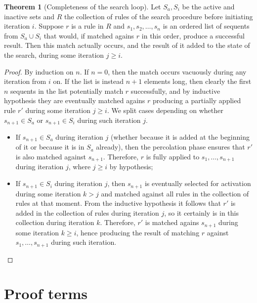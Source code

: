 \documentclass{article}
\theoremstyle{definition}
\newtheorem{theorem}{Theorem}
\begin{document}
\begin{theorem}[Completeness of the search loop]
  Let $S_a, S_i$ be the active and inactive sets and $R$ the collection of rules
  of the search procedure before initiating iteration $i$. Suppose $r$ is a rule
  in $R$ and $s_1, s_2, \dots, s_n$ is an ordered list of sequents from
  $S_a \cup S_i$ that would, if matched agains $r$ in this order, produce a
  successful result. Then this match actually occurs, and the result of it added
  to the state of the search, during some iteration $j \geq i$.
\end{theorem}
\begin{proof}
  By induction on $n$. If $n = 0$, then the match occurs vacuously during any
  iteration from $i$ on. If the list is instead $n+1$ elements long, then
  clearly the first $n$ sequents in the list potentially match $r$ successfully,
  and by inductive hypothesis they are eventually matched agains $r$ producing a
  partially applied rule $r'$ during some iteration $j \geq i$. We split cases
  depending on whether $s_{n+1} \in S_a$ or $s_{n+1} \in S_i$ during such
  iteration $j$.

  \begin{itemize}
  \item If $s_{n+1} \in S_a$ during iteration $j$ (whether because it is added
    at the beginning of it or because it is in $S_a$ already), then the
    percolation phase ensures that $r'$ is also matched against
    $s_{n+1}$. Therefore, $r$ is fully applied to $s_1, \dots, s_{n+1}$ during
    iteration $j$, where $j \geq i$ by hypothesis;

  \item If $s_{n+1} \in S_i$ during iteration $j$, then $s_{n+1}$ is eventually
    selected for activation during some iteration $k > j$ and matched against
    all rules in the collection of rules at that moment. From the inductive
    hypothesis it follows that $r'$ is added in the collection of rules during
    iteration $j$, so it certainly is in this collection during iteration
    $k$. Therefore, $r'$ is matched agains $s_{n+1}$ during some iteration
    $k \geq i$, hence producing the result of matching $r$ against
    $s_1, \dots, s_{n+1}$ during such iteration.
  \end{itemize}
\end{proof}

% 

\section{Proof terms}
\end{document}
